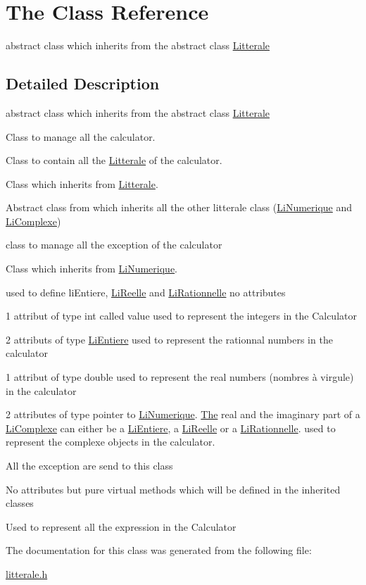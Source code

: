 \hypertarget{class_the}{}\section{The Class Reference}
\label{class_the}


abstract class which inherits from the abstract class \hyperlink{class_litterale}{Litterale}  




\subsection{Detailed Description}
abstract class which inherits from the abstract class \hyperlink{class_litterale}{Litterale} 

Class to manage all the calculator.

Class to contain all the \hyperlink{class_litterale}{Litterale} of the calculator.

Class which inherits from \hyperlink{class_litterale}{Litterale}.

Abstract class from which inherits all the other litterale class (\hyperlink{class_li_numerique}{Li\+Numerique} and \hyperlink{class_li_complexe}{Li\+Complexe})

class to manage all the exception of the calculator

Class which inherits from \hyperlink{class_li_numerique}{Li\+Numerique}.

used to define li\+Entiere, \hyperlink{class_li_reelle}{Li\+Reelle} and \hyperlink{class_li_rationnelle}{Li\+Rationnelle} no attributes

1 attribut of type int called value used to represent the integers in the Calculator

2 attributs of type \hyperlink{class_li_entiere}{Li\+Entiere} used to represent the rationnal numbers in the calculator

1 attribut of type double used to represent the real numbers (nombres à virgule) in the calculator

2 attributes of type pointer to \hyperlink{class_li_numerique}{Li\+Numerique}. \hyperlink{class_the}{The} real and the imaginary part of a \hyperlink{class_li_complexe}{Li\+Complexe} can either be a \hyperlink{class_li_entiere}{Li\+Entiere}, a \hyperlink{class_li_reelle}{Li\+Reelle} or a \hyperlink{class_li_rationnelle}{Li\+Rationnelle}. used to represent the complexe objects in the calculator.

All the exception are send to this class

No attributes but pure virtual methods which will be defined in the inherited classes

Used to represent all the expression in the Calculator 

The documentation for this class was generated from the following file\+:\begin{DoxyCompactItemize}
\item 
\hyperlink{litterale_8h}{litterale.\+h}\end{DoxyCompactItemize}
